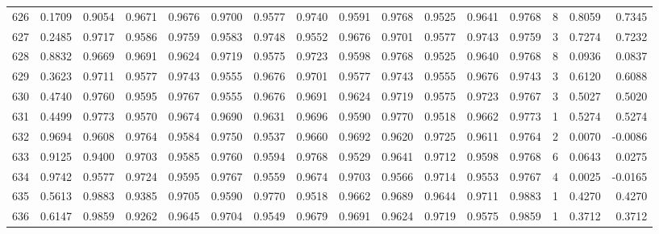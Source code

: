 \begin{tabular}{lrrrrrrrrrrrrrrr}
626 &      0.1709 &  0.9054 &  0.9671 &  0.9676 &  0.9700 &  0.9577 &  0.9740 &  0.9591 &  0.9768 &  0.9525 &   0.9641 &     0.9768 &      8 &                    0.8059 &                     0.7345 \\
627 &      0.2485 &  0.9717 &  0.9586 &  0.9759 &  0.9583 &  0.9748 &  0.9552 &  0.9676 &  0.9701 &  0.9577 &   0.9743 &     0.9759 &      3 &                    0.7274 &                     0.7232 \\
628 &      0.8832 &  0.9669 &  0.9691 &  0.9624 &  0.9719 &  0.9575 &  0.9723 &  0.9598 &  0.9768 &  0.9525 &   0.9640 &     0.9768 &      8 &                    0.0936 &                     0.0837 \\
629 &      0.3623 &  0.9711 &  0.9577 &  0.9743 &  0.9555 &  0.9676 &  0.9701 &  0.9577 &  0.9743 &  0.9555 &   0.9676 &     0.9743 &      3 &                    0.6120 &                     0.6088 \\
630 &      0.4740 &  0.9760 &  0.9595 &  0.9767 &  0.9555 &  0.9676 &  0.9691 &  0.9624 &  0.9719 &  0.9575 &   0.9723 &     0.9767 &      3 &                    0.5027 &                     0.5020 \\
631 &      0.4499 &  0.9773 &  0.9570 &  0.9674 &  0.9690 &  0.9631 &  0.9696 &  0.9590 &  0.9770 &  0.9518 &   0.9662 &     0.9773 &      1 &                    0.5274 &                     0.5274 \\
632 &      0.9694 &  0.9608 &  0.9764 &  0.9584 &  0.9750 &  0.9537 &  0.9660 &  0.9692 &  0.9620 &  0.9725 &   0.9611 &     0.9764 &      2 &                    0.0070 &                    -0.0086 \\
633 &      0.9125 &  0.9400 &  0.9703 &  0.9585 &  0.9760 &  0.9594 &  0.9768 &  0.9529 &  0.9641 &  0.9712 &   0.9598 &     0.9768 &      6 &                    0.0643 &                     0.0275 \\
634 &      0.9742 &  0.9577 &  0.9724 &  0.9595 &  0.9767 &  0.9559 &  0.9674 &  0.9703 &  0.9566 &  0.9714 &   0.9553 &     0.9767 &      4 &                    0.0025 &                    -0.0165 \\
635 &      0.5613 &  0.9883 &  0.9385 &  0.9705 &  0.9590 &  0.9770 &  0.9518 &  0.9662 &  0.9689 &  0.9644 &   0.9711 &     0.9883 &      1 &                    0.4270 &                     0.4270 \\
636 &      0.6147 &  0.9859 &  0.9262 &  0.9645 &  0.9704 &  0.9549 &  0.9679 &  0.9691 &  0.9624 &  0.9719 &   0.9575 &     0.9859 &      1 &                    0.3712 &                     0.3712 \\

\end{tabular}
